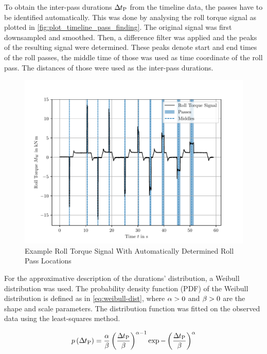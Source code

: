 To obtain the inter-pass durations ${{\Delta\mspace{-1mu}t}_\mathrm{P}}$ from the timeline data, the passes have to be identified automatically.
This was done by analysing the roll torque signal as plotted in \autoref{fig:plot_timeline_pass_finding}.
The original signal was first downsampled and smoothed.
Then, a difference filter was applied and the peaks of the resulting signal were determined.
These peaks denote start and end times of the roll passes, the middle time of those was used as time coordinate of the roll pass.
The distances of those were used as the inter-pass durations.

\begin{figure}
    \centering
    \includegraphics{img/plot_timeline_pass_finding}
    \caption{Example Roll Torque Signal With Automatically Determined Roll Pass Locations}
    \label{fig:plot_timeline_pass_finding}
\end{figure}

For the approximative description of the durations' distribution, a Weibull distribution was used.
The probability density function (PDF) of the Weibull distribution is defined as in \autoref{eq:weibull-dist},
where ${\alpha} > 0$ and ${\beta} > 0$ are the shape and scale parameters.
The distribution function was fitted on the observed data using the least-squares method.

\begin{equation}
    p\left({{\Delta\mspace{-1mu}t}_\mathrm{P}} \right)=\frac{{\alpha}}{{\beta}} \left(\frac{{{\Delta\mspace{-1mu}t}_\mathrm{P}}}{{\beta}}\right)^{{\alpha}-1}\exp -\left(\frac{{{\Delta\mspace{-1mu}t}_\mathrm{P}}}{{\beta}} \right)^{{\alpha}}
    \label{eq:weibull-dist}
\end{equation}

